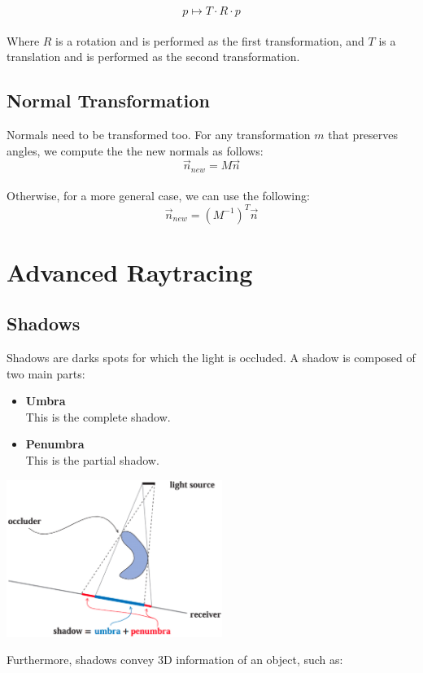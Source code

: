 \documentclass{article}
\begin{document}
\[ p \mapsto T \cdot R \cdot p \] \\
Where $R$ is a rotation and is performed as the first transformation, and $T$ is a translation and is performed as the second transformation.

\subsection{Normal Transformation}
Normals need to be transformed too. For any transformation $m$ that preserves angles, we compute the the new normals as follows:
\[ \overrightarrow{n}_{new} = M\overrightarrow{n} \] \\
Otherwise, for a more general case, we can use the following:
\[ \overrightarrow{n}_{new} = (M^{-1})^T\overrightarrow{n} \]

\section{Advanced Raytracing}
\subsection{Shadows}
Shadows are darks spots for which the light is occluded. A shadow is composed of two main parts:

\begin{itemize}
	\item \textbf{Umbra}
	\vspace{.2cm} \\
	This is the complete shadow.
	
	\item \textbf{Penumbra}
	\vspace{.2cm} \\
	This is the partial shadow.
\end{itemize}
\vspace{0cm}

\begin{center}
	\includegraphics[width=7cm]{shadow.png}
\end{center}
\vspace{.3cm}
Furthermore, shadows convey 3D information of an object, such as:
\end{document}
